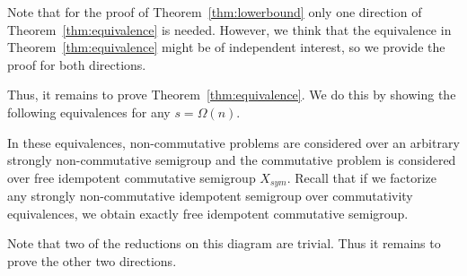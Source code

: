 \documentclass{toc}
\begin{document}
Note that for the proof of Theorem~\ref{thm:lowerbound} only one direction of
Theorem~\ref{thm:equivalence} is needed. However, we think that the equivalence
in Theorem~\ref{thm:equivalence} might be of independent interest, so we provide
the proof for both directions.

Thus, it remains to prove Theorem~\ref{thm:equivalence}. We do this by showing
the following equivalences for any $s = \Omega(n)$.

\vspace{2mm}
\begin{center}
\end{center}
\vspace{2mm}

In these equivalences, non-commutative problems are considered over an arbitrary
strongly non-commutative semigroup and the commutative problem is considered
over free idempotent commutative semigroup $X_{sym}$. Recall that
if we factorize any strongly non-commutative idempotent semigroup over
commutativity equivalences, we obtain exactly free idempotent commutative
semigroup.

Note that two of the reductions on this diagram are trivial. Thus it remains to prove the other two directions.

%
%
\end{document}
